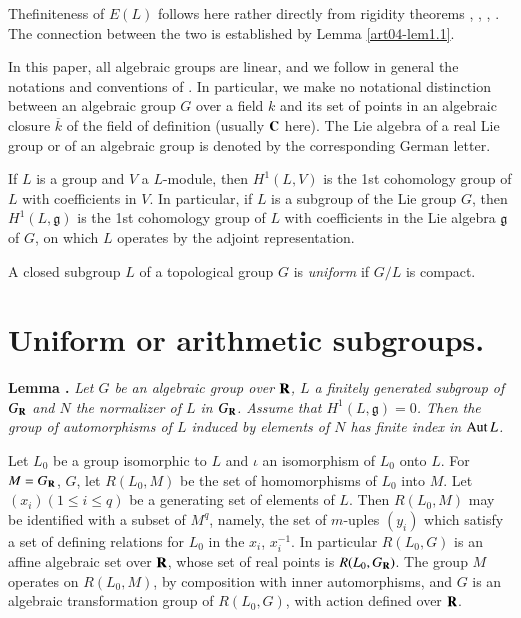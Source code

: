 \eject

The\pageoriginale finiteness of $E(L)$ follows here rather directly from rigidity theorems \cite{art04-key25}, \cite{art04-key26}, \cite{art04-key32}, \cite{art04-key33}. The connection between the two is established by Lemma \ref{art04-lem1.1}.

\begin{notation*}
In this paper, all algebraic groups are linear, and we follow in general the notations and conventions of \cite{art04-key9}. In particular, we make no notational distinction between an algebraic group $G$ over a field $k$ and its set of points in an algebraic closure $\overline{k}$ of the field of definition (usually $\mathbf{C}$ here). The Lie algebra of a real Lie group or of an algebraic group is denoted by the corresponding German letter.
\end{notation*}

If $L$ is a group and $V$ a $L$-module, then $H^{1}(L,V)$ is the 1st cohomology group of $L$ with coefficients in $V$. In particular, if $L$ is a subgroup of the Lie group $G$, then $H^{1}(L,\mathfrak{g})$ is the 1st cohomology group of $L$ with coefficients in the Lie algebra $\mathfrak{g}$ of $G$, on which $L$ operates by the adjoint representation.

A closed subgroup $L$ of a topological group $G$ is {\em uniform} if $G/L$ is compact.

\section{Uniform or arithmetic subgroups.}\label{art04-sec1}

\noindent
{\bf Lemma .\label{art04-lem1.1}}
{\em Let $G$ be an algebraic group over $\mathbf{R}$, $L$ a finitely generated subgroup of $G_{\mathbf{R}}$ and $N$ the normalizer of $L$ in $G_{\mathbf{R}}$. Assume that $H^{1}(L,\mathfrak{g})=0$. Then the group of automorphisms of $L$ induced by elements of $N$ has finite index in $\operatorname{\mathrm{Aut}} L$.}
\smallskip

Let $L_{0}$ be a group isomorphic to $L$ and $\iota$ an isomorphism of $L_{0}$ onto $L$. For $M=G_{\mathbf{R}}$, $G$, let $R(L_{0},M)$ be the set of homomorphisms of $L_{0}$ into $M$. Let $(x_{i})(1\leq i\leq q)$ be a generating set of elements of $L$. Then $R(L_{0},M)$ may be identified with a subset of $M^{q}$, namely, the set of $m$-uples $(y_{i})$ which satisfy a set of defining relations for $L_{0}$ in the $x_{i}$, $x_{i}^{-1}$. In particular $R(L_{0},G)$ is an affine algebraic set over $\mathbf{R}$, whose set of real points is $R(L_{0},G_{\mathbf{R}})$. The group $M$ operates on $R(L_{0},M)$, by composition with inner automorphisms, and $G$ is an algebraic transformation group of $R(L_{0},G)$, with action defined over $\mathbf{R}$.

